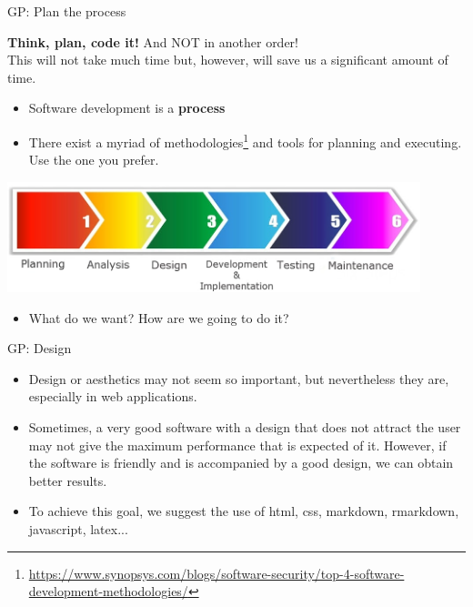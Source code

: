 \documentclass[ignorenonframetext,]{beamer}
\providecommand{\tightlist}{%
  \setlength{\itemsep}{0pt}\setlength{\parskip}{0pt}}
\begin{document}
\begin{frame}{%
\protect\hypertarget{gp-plan-the-process}{%
GP: Plan the process}}

\textbf{Think, plan, code it!} And NOT in another order!\\ 
This will not take much time but, however, will save us a significant
amount of time.

\begin{itemize}
\tightlist
\item
  Software development is a \textbf{process}
\item
  There exist a myriad of methodologies\footnote{\url{https://www.synopsys.com/blogs/software-security/top-4-software-development-methodologies/}} and tools for planning and
  executing. Use the one you prefer.
\end{itemize}

\begin{center}
\includegraphics[width=0.9\textwidth]{"images/softwareDevelopmentProcess"}
\end{center}

\begin{itemize}
	\tightlist
	\item
	What do we want? How are we going to do it? 
\end{itemize}

\end{frame}

\begin{frame}{%
		\protect\hypertarget{gp-design}{%
			GP: Design}}
	\begin{itemize}
		\item
		Design or aesthetics may not seem so important, but nevertheless they are,
		especially in web applications.
		\item
		Sometimes, a very good software with a design that does not attract the
		user may not give the maximum performance that is expected of it.
		However, if the software is friendly and is accompanied by a good design,
		we can obtain better results.
		\item
		To achieve this goal, we suggest the use of html, css, markdown,
		rmarkdown, javascript, latex...
    \end{itemize}
    
\end{frame}
\end{document}

